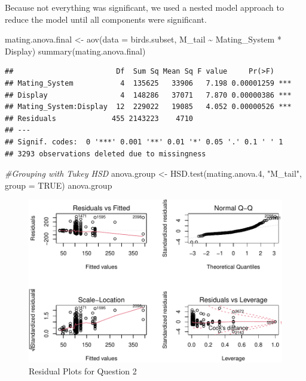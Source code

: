 \documentclass[
  12pt,
]{article}
\newenvironment{Shaded}{\begin{snugshade}}{\end{snugshade}}
\newcommand{\AttributeTok}[1]{\textcolor[rgb]{0.77,0.63,0.00}{#1}}
\newcommand{\CommentTok}[1]{\textcolor[rgb]{0.56,0.35,0.01}{\textit{#1}}}
\newcommand{\ConstantTok}[1]{\textcolor[rgb]{0.00,0.00,0.00}{#1}}
\newcommand{\FloatTok}[1]{\textcolor[rgb]{0.00,0.00,0.81}{#1}}
\newcommand{\FunctionTok}[1]{\textcolor[rgb]{0.00,0.00,0.00}{#1}}
\newcommand{\NormalTok}[1]{#1}
\newcommand{\OtherTok}[1]{\textcolor[rgb]{0.56,0.35,0.01}{#1}}
\newcommand{\SpecialCharTok}[1]{\textcolor[rgb]{0.00,0.00,0.00}{#1}}
\newcommand{\StringTok}[1]{\textcolor[rgb]{0.31,0.60,0.02}{#1}}
\begin{document}
\newpage

Because not everything was significant, we used a nested model approach
to reduce the model until all components were significant.

\begin{Shaded}
\begin{Highlighting}[]
\NormalTok{mating.anova.final }\OtherTok{\textless{}{-}} \FunctionTok{aov}\NormalTok{(}\AttributeTok{data =}\NormalTok{ birds.subset, M\_tail }\SpecialCharTok{\textasciitilde{}}\NormalTok{ Mating\_System }\SpecialCharTok{*}\NormalTok{ Display)}
\FunctionTok{summary}\NormalTok{(mating.anova.final)}
\end{Highlighting}
\end{Shaded}

\begin{verbatim}
##                        Df  Sum Sq Mean Sq F value     Pr(>F)    
## Mating_System           4  135625   33906   7.198 0.00001259 ***
## Display                 4  148286   37071   7.870 0.00000386 ***
## Mating_System:Display  12  229022   19085   4.052 0.00000526 ***
## Residuals             455 2143223    4710                       
## ---
## Signif. codes:  0 '***' 0.001 '**' 0.01 '*' 0.05 '.' 0.1 ' ' 1
## 3293 observations deleted due to missingness
\end{verbatim}

\begin{Shaded}
\begin{Highlighting}[]
\CommentTok{\#Grouping with Tukey HSD}
\NormalTok{anova.group }\OtherTok{\textless{}{-}} \FunctionTok{HSD.test}\NormalTok{(mating.anova}\FloatTok{.4}\NormalTok{, }\StringTok{"M\_tail"}\NormalTok{, }\AttributeTok{group =} \ConstantTok{TRUE}\NormalTok{)}
\NormalTok{anova.group}
\end{Highlighting}
\end{Shaded}

\begin{figure}
\centering
\includegraphics{Project_Code_files/figure-latex/q-2 residual-1.pdf}
\caption{Residual Plots for Question 2}
\end{figure}
\end{document}

